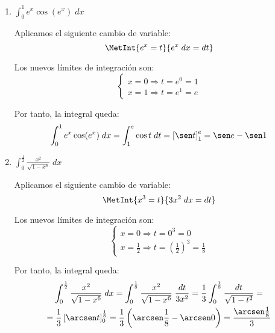 \begin{ejercicio}
\begin{enumerate}
        \item $\displaystyle \int_0^1 e^x \cos(e^x)\;dx$
        
        Aplicamos el siguiente cambio de variable:
        \begin{equation*}
            \MetInt{e^x=t}{e^x\;dx=dt}
        \end{equation*}
        
        Los nuevos límites de integración son:
        \begin{equation*}
            \left\{\begin{array}{l}
                x=0 \Longrightarrow t=e^0 =1 \\
                x=1 \Longrightarrow t=e^1 =e
            \end{array}\right.
        \end{equation*}

        Por tanto, la integral queda:
        \begin{equation*}
            \int_0^1 e^x \cos(e^x)\;dx
            = \int_1^e \cos t\;dt
            = \left[\sen t\right]_1^e
            = \sen e - \sen 1
        \end{equation*}

        \item $\displaystyle \int_0^{\frac{1}{2}} \frac{x^2}{\sqrt{1-x^6}}\;dx$
        
        Aplicamos el siguiente cambio de variable:
        \begin{equation*}
            \MetInt{x^3=t}{3x^2\;dx=dt}
        \end{equation*}

        Los nuevos límites de integración son:
        \begin{equation*}
            \left\{\begin{array}{l}
                x=0 \Longrightarrow t=0^3 =0 \\
                x=\frac{1}{2} \Longrightarrow t=\left(\frac{1}{2}\right)^3 =\frac{1}{8}
            \end{array}\right.
        \end{equation*}

        Por tanto, la integral queda:
        \begin{multline*}
            \int_0^{\frac{1}{2}} \frac{x^2}{\sqrt{1-x^6}}\;dx
            = \int_0^{\frac{1}{8}} \frac{x^2}{\sqrt{1-x^6}}\;\frac{dt}{3x^2}
            = \frac{1}{3}\int_0^{\frac{1}{8}} \frac{dt}{\sqrt{1-t^2}}
            =\\= \frac{1}{3}\left[\arcsen t\right]_0^{\frac{1}{8}}
            = \frac{1}{3}\left(\arcsen \frac{1}{8}-\arcsen 0\right)
            = \frac{\arcsen \frac{1}{8}}{3}
        \end{multline*}


\end{enumerate}
\end{ejercicio}
